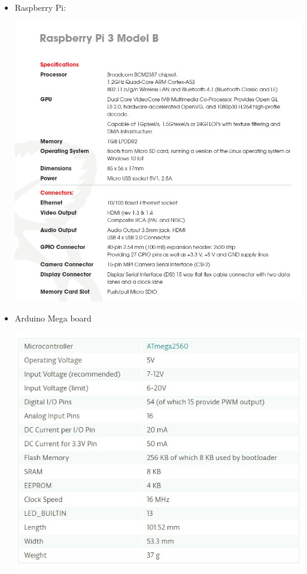 \documentclass[a4paper,12pt,oneside]{book}
\begin{document}
\begin{itemize}
\begin{center}
	\end{center}
  \item Raspberry Pi:
	\begin{center}
		\includegraphics[scale=.4]{Raspberry_Pi_datasheet.jpg}
	\end{center}
  \item Arduino Mega board
	\begin{center}
		\includegraphics[scale=.6]{Arduinoboard_datasheet.jpg}
	\end{center}
\end{itemize}
\end{document}
